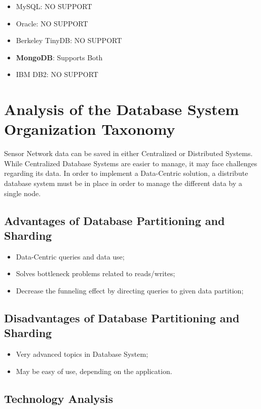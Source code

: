 \begin{itemize}
  \item MySQL: NO SUPPORT
  \item Oracle: NO SUPPORT
  \item Berkeley TinyDB: NO SUPPORT
  \item \textbf{MongoDB}: Supports Both
  \item IBM DB2: NO SUPPORT
\end{itemize}

\section{Analysis of the Database System Organization Taxonomy}

Sensor Network data can be saved in either Centralized or Distributed Systems.
While Centralized Database Systems are easier to manage, it may
face challenges regarding its data. In order to implement a Data-Centric
solution, a distribute database system must be in place in order to manage
the different data by a single node.

\subsection{Advantages of Database Partitioning and Sharding}

\begin{itemize}
  \item Data-Centric queries and data use;
  \item Solves bottleneck problems related to reads/writes;
  \item Decrease the funneling effect by directing queries to given data
  partition;
\end{itemize}

\subsection{Disadvantages of Database Partitioning and Sharding}

\begin{itemize}
  \item Very advanced topics in Database System;
  \item May be easy of use, depending on the application.
\end{itemize}

\subsection{Technology Analysis}

